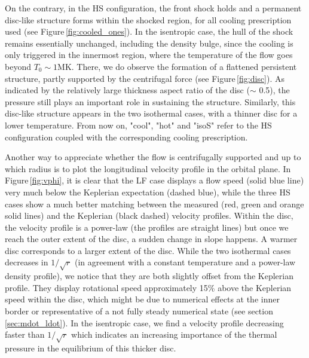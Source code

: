 \documentclass{aa}
\begin{document}
On the contrary, in the HS configuration, the front shock holds and a permanent disc-like structure forms within the shocked region, for all cooling prescription used (see Figure\,\ref{fig:cooled_ones}). In the isentropic case, the hull of the shock remains essentially unchanged, including the density bulge, since the cooling is only triggered in the innermost region, where the temperature of the flow goes beyond $T_0\sim 1$MK. There, we do observe the formation of a flattened persistent structure, partly supported by the centrifugal force (see Figure\,\ref{fig:disc}). As indicated by the relatively large thickness aspect ratio of the disc ($\sim$ 0.5), the pressure still plays an important role in sustaining the structure. Similarly, this disc-like structure appears in the two isothermal cases, with a thinner disc for a lower temperature. From now on, "cool", "hot" and "isoS" refer to the HS configuration coupled with the corresponding cooling prescription.

Another way to appreciate whether the flow is centrifugally supported and up to which radius is to plot the longitudinal velocity profile in the orbital plane. In Figure\,\ref{fig:vphi}, it is clear that the LF case displays a flow speed (solid blue line) very much below the Keplerian expectation (dashed blue), while the three HS cases show a much better matching between the measured (red, green and orange solid lines) and the Keplerian (black dashed) velocity profiles. Within the disc, the velocity profile is a power-law (the profiles are straight lines) but once we reach the outer extent of the disc, a sudden change in slope happens. A warmer disc corresponds to a larger extent of the disc. While the two isothermal cases decreases in $1/\sqrt{r}$ (in agreement with a constant temperature and a power-law density profile), we notice that they are both slightly offset from the Keplerian profile. They display rotational speed approximately 15\% above the Keplerian speed within the disc, which might be due to numerical effects at the inner border or representative of a not fully steady numerical state (see section\,\ref{sec:mdot_ldot}). In the isentropic case, we find a velocity profile decreasing faster than $1/\sqrt{r}$ which indicates an increasing importance of the thermal pressure in the equilibrium of this thicker disc.
\end{document}
